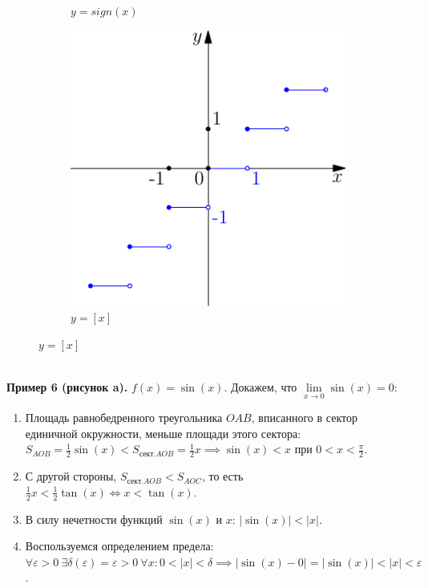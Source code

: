 \documentclass{article}
\begin{document}
\begin{figure}[h]
\begin{subfigure}[t]{0.3\textwidth}
            \caption{\(y = sign(x)\)}
        \end{subfigure}
        \hfill
        \begin{subfigure}[t]{0.3\textwidth}
            \includegraphics{pic-3.pdf}
            \caption{\(y = [x]\)}
        \end{subfigure}
    \end{figure}\\
    \textbf{Пример 6 (рисунок a).} \(f(x) = \sin(x)\). Докажем, что \(\displaystyle \lim\limits_{x \to 0}\sin(x) = 0\):
    \begin{enumerate}
        \item Площадь равнобедренного треугольника \(OAB\), вписанного в сектор единичной окружности, меньше площади этого сектора: 
        \(\displaystyle S_{AOB} = \frac{1}{2}\sin(x) < S_{\text{сект.} AOB} = \frac{1}{2}x \implies \sin(x) < x\) при \(\displaystyle 0 < x < \frac{\pi}{2}\).
        \item С другой стороны, \(\displaystyle S_{\text{сект.} AOB} < S_{AOC}\), то есть \(\displaystyle \frac{1}{2}x < \frac{1}{2} \tan(x) \iff x < \tan(x)\).
        \item В силу нечетности функций \(\sin(x)\) и \(x\): \(|\sin(x)| < |x|\).
        \item Воспользуемся определением предела: \(\displaystyle \forall \varepsilon > 0\ \exists \delta(\varepsilon) = \varepsilon > 0\ \forall x: 0 < |x| < \delta \implies |\sin(x) - 0| = |\sin(x)| < |x| < \varepsilon\).
    \end{enumerate}       
\end{document}

